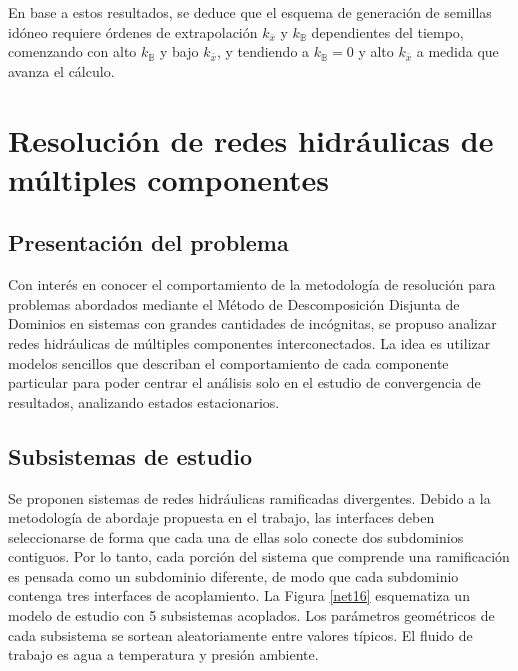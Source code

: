 En base a estos resultados, se deduce que el esquema de generación de semillas idóneo
requiere órdenes de extrapolación $k_{\bar{x}}$ y $k_{\mathbb{B}}$ dependientes del tiempo,
comenzando con alto $k_{\mathbb{B}}$ y bajo $k_{\bar{x}}$, y tendiendo a $k_{\mathbb{B}}=0$ y alto $k_{\bar{x}}$ a medida que avanza el cálculo.

\section{Resolución de redes hidráulicas de múltiples componentes}
\label{3:redes}

\subsection*{Presentación del problema}
\label{3:redes-presentacion}

Con interés en conocer el comportamiento de la metodología de resolución
para problemas abordados mediante el Método de Descomposición Disjunta de Dominios en sistemas con grandes cantidades de incógnitas,
se propuso analizar redes hidráulicas de múltiples componentes interconectados.
La idea es utilizar modelos sencillos que describan el comportamiento de cada componente particular para poder centrar el análisis solo en el estudio de convergencia
de resultados, analizando estados estacionarios.


\subsection*{Subsistemas de estudio}
\label{3:redes-subsistemas}

Se proponen sistemas de redes hidráulicas ramificadas divergentes.
Debido a la metodología de abordaje propuesta en el trabajo, las interfaces deben seleccionarse de forma que cada una de ellas solo conecte dos subdominios contiguos.
Por lo tanto, cada porción del sistema que comprende una ramificación es pensada como un subdominio diferente,
de modo que cada subdominio contenga tres interfaces de acoplamiento.
La Figura \ref{net16} esquematiza un modelo de estudio con 5 subsistemas acoplados.
Los parámetros geométricos de cada subsistema se sortean aleatoriamente entre valores típicos.
El fluido de trabajo es agua a temperatura y presión ambiente.

